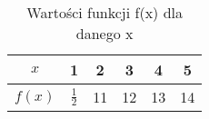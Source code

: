 \begin{table}[htbp]
\centering
\def\arraystretch{1.2}
\begin{tabular}{|c|c|c|c|c|c|}
	\hline
	$x$ & 1 & 2 & 3 & 4 & 5\\ \hline
	$f(x)$ & $\frac{1}{2}$ & 11 & 12 & 13 & 14\\ \hline
\end{tabular}
\caption{Wartości funkcji f(x) dla danego x}
\label{tab:funkcja}
\end{table}